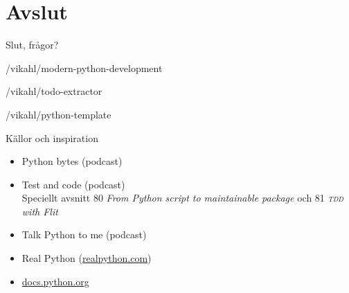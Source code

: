 {%
\section*{Avslut}
}

\begin{frame}[standout]
  Slut, frågor?

  {\small{}/vikahl/modern-python-development}

  {\small{}/vikahl/todo-extractor}

  {\small{}/vikahl/python-template}
\end{frame}

\begin{frame}
  \titlepage{}
\end{frame}

\begin{frame}{Källor och inspiration}
  \begin{itemize}
    \item Python bytes (podcast)
    \item Test and code (podcast)\\
      {\small Speciellt avsnitt 80 \emph{From Python script to maintainable package} och 81 \emph{\textsc{tdd} with Flit}}
    \item Talk Python to me (podcast)
    \item Real Python (\url{realpython.com})
    \item \url{docs.python.org}
  \end{itemize}
\end{frame}
